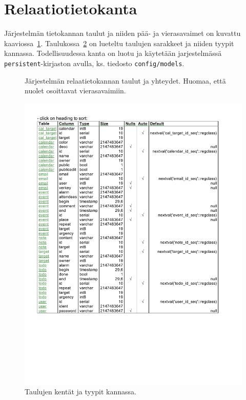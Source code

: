 \documentclass[a4paper,12pt]{report}
\begin{document}
\section{Relaatiotietokanta}
Järjestelmän tietokannan taulut ja niiden pää- ja vierasavaimet on kuvattu
kaaviossa~\ref{graph_database}. Taulukossa~\ref{graph_columns} on lueteltu
taulujen sarakkeet ja niiden tyypit kannassa. Todellisuudessa kanta on luotu ja
käytetään jarjestelmässä \texttt{persistent}-kirjaston avulla, ks. tiedosto
\texttt{config/models}.
\begin{figure}[hb]
   \centering
   \caption{Järjestelmän relaatietokannan taulut ja yhteydet. Huomaa, että
   nuolet osoittavat vierasavaimiin.}
   \label{graph_database}
\end{figure}
\begin{figure}[ht]
   \centering
   \includegraphics[clip,trim=1.2cm 7.05cm 9.21cm 1.81cm]{columns.pdf}
   \caption{Taulujen kentät ja tyypit kannassa.}
   \label{graph_columns}
\end{figure}
\clearpage
\end{document}
